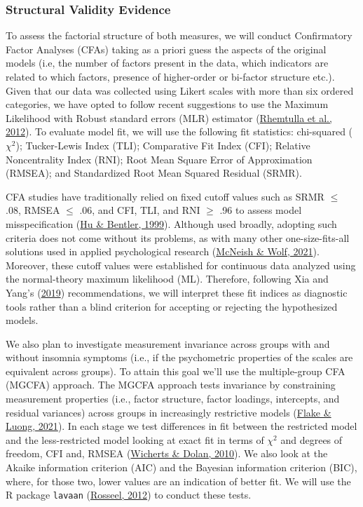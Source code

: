 \documentclass[
  ,doc,11pt, twoside,floatsintext]{apa6}
\begin{document}
\hypertarget{structural-validity-evidence}{%
\subsubsection{Structural Validity Evidence}\label{structural-validity-evidence}}

To assess the factorial structure of both measures, we will conduct Confirmatory Factor Analyses (CFAs) taking as a priori guess the aspects of the original models (i.e, the number of factors present in the data, which indicators are related to which factors, presence of higher-order or bi-factor structure etc.). Given that our data was collected using Likert scales with more than six ordered categories, we have opted to follow recent suggestions to use the Maximum Likelihood with Robust standard errors (MLR) estimator (\protect\hyperlink{ref-rhemtulla2012}{Rhemtulla et al., 2012}). To evaluate model fit, we will use the following fit statistics: chi-squared (\(\chi^2\)); Tucker-Lewis Index (TLI); Comparative Fit Index (CFI); Relative Noncentrality Index (RNI); Root Mean Square Error of Approximation (RMSEA); and Standardized Root Mean Squared Residual (SRMR).

CFA studies have traditionally relied on fixed cutoff values such as SRMR \(\le\) .08, RMSEA \(\le\) .06, and CFI, TLI, and RNI \(\ge\) .96 to assess model misspecification (\protect\hyperlink{ref-hu1999}{Hu \& Bentler, 1999}). Although used broadly, adopting such criteria does not come without its problems, as with many other one-size-fits-all solutions used in applied psychological research (\protect\hyperlink{ref-mcneish2021}{McNeish \& Wolf, 2021}). Moreover, these cutoff values were established for continuous data analyzed using the normal-theory maximum likelihood (ML). Therefore, following Xia and Yang's (\protect\hyperlink{ref-xia2019}{2019}) recommendations, we will interpret these fit indices as diagnostic tools rather than a blind criterion for accepting or rejecting the hypothesized models.

We also plan to investigate measurement invariance across groups with and without insomnia symptoms (i.e., if the psychometric properties of the scales are equivalent across groups). To attain this goal we'll use the multiple-group CFA (MGCFA) approach. The MGCFA approach tests invariance by constraining measurement properties (i.e., factor structure, factor loadings, intercepts, and residual variances) across groups in increasingly restrictive models (\protect\hyperlink{ref-flake2021}{Flake \& Luong, 2021}). In each stage we test differences in fit between the restricted model and the less-restricted model looking at exact fit in terms of \(\chi^2\) and degrees of freedom, CFI and, RMSEA (\protect\hyperlink{ref-wicherts2010}{Wicherts \& Dolan, 2010}). We also look at the Akaike information criterion (AIC) and the Bayesian information criterion (BIC), where, for those two, lower values are an indication of better fit. We will use the R package \texttt{lavaan} (\protect\hyperlink{ref-lavaan}{Rosseel, 2012}) to conduct these tests.
\end{document}
